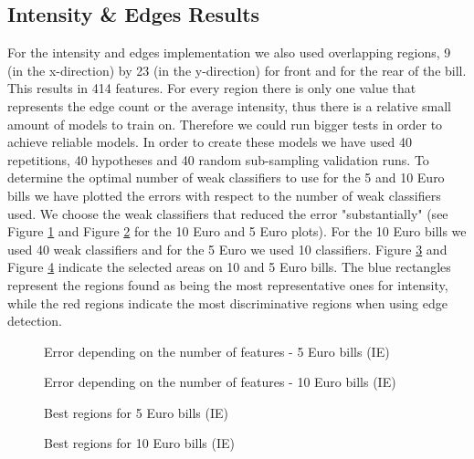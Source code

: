 \documentclass[11pt,twocolumn]{article}
\begin{document}
		
		\subsection{Intensity \& Edges Results}\label{sec:ie_results}
			For the intensity and edges implementation we also used overlapping regions, 9 (in the x-direction) by 23 (in the y-direction) for front and for the rear of the bill. This results in 414 features. For every region there is only one value that represents the edge count or the average intensity, thus there is a relative small amount of models to train on. Therefore we could run bigger tests in order to achieve reliable models. In order to create these models we have used 40 repetitions, 40 hypotheses and 40 random sub-sampling validation runs. To determine the optimal number of weak classifiers to use for the 5 and 10 Euro bills we have plotted the errors with respect to the number of weak classifiers used. We choose the weak classifiers that reduced the error "substantially" (see Figure \ref{IE_plot5} and Figure \ref{IE_plot10} for the 10 Euro and 5 Euro plots). For the 10 Euro bills we used 40 weak classifiers and for the 5 Euro we used 10 classifiers. Figure \ref{ie_regions5} and Figure \ref{ie_regions10} indicate the selected areas on 10 and 5 Euro bills. The blue rectangles represent the regions found as being the most representative ones for intensity, while the red regions indicate the most discriminative regions when using edge detection.

		\begin{figure}[!hbtp]
			\centering
			\caption{Error depending on the number of features - 5 Euro bills (IE)}
			\label{IE_plot5}
		\end{figure} 

		\begin{figure}[!hbtp]
			\centering
			\caption{Error depending on the number of features - 10 Euro bills (IE)}
			\label{IE_plot10}
		\end{figure} 
		
		\begin{figure}[!hbtp]
			\centering
			\caption{Best regions for 5 Euro bills (IE)}
			\label{ie_regions5}
		\end{figure}
		
		\begin{figure}[!hbtp]
			\centering
			\caption{Best regions for 10 Euro bills (IE)}
			\label{ie_regions10}
		\end{figure}
		
\end{document}
